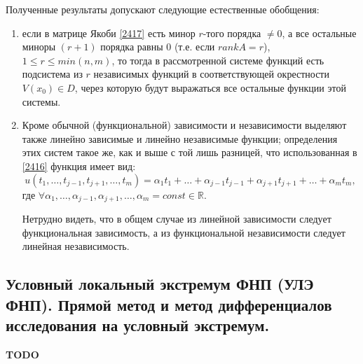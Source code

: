 \begin{note}
    Полученные результаты допускают следующие естественные обобщения:
    \begin{enumerate}
        \item если в матрице Якоби \eqref{2417} есть минор $r$-того порядка $\ne 0$, а все остальные миноры $(r+1)$ порядка равны $0$ (т.е. если $rankA = r$), $1 \leqslant r \leqslant min(n,m)$, то тогда в рассмотренной системе функций есть подсистема из $r$ независимых функций в соответствующей окрестности $V(x_0) \in D$, через которую будут выражаться все остальные функции этой системы.
        \item Кроме обычной (функциональной) зависимости и независимости выделяют также линейно зависимые и линейно независимые функции; определения этих систем такое же, как и выше с той лишь разницей, что использованная в \eqref{2416} функция имеет вид:
        \begin{equation*}
        u(t_1, \ldots, t_{j-1}, t_{j+1}, \ldots, t_m) = \alpha_1 t_1 + \ldots + \alpha_{j-1} t_{j-1} + \alpha_{j+1} t_{j+1} + \ldots + \alpha_m t_m,
        \end{equation*}
        где $\forall \alpha_1, \ldots, \alpha_{j-1}, \alpha_{j+1}, \ldots, \alpha_m = const \in \mathbb{R}$.
        
        Нетрудно видеть, что в общем случае из линейной зависимости следует функциональная зависимость, а из функциональной независимости следует линейная независимость.
    \end{enumerate}
\end{note}

\subsection{Условный локальный экстремум ФНП (УЛЭ ФНП). Прямой метод и метод дифференциалов исследования на условный экстремум.}
\textbf{TODO}

